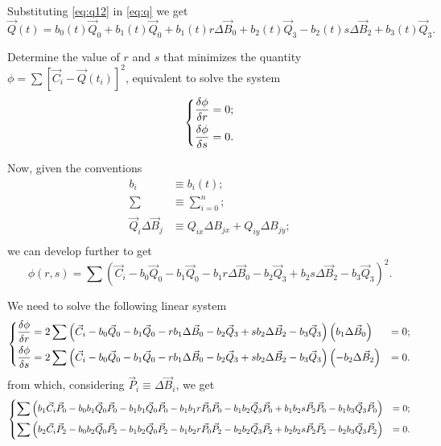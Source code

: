 \documentclass{scrartcl}
\newcommand\V[1]{\vec{#1}}
\begin{document}
Substituting \eqref{eq:q12} in \eqref{eq:q} we get
\begin{equation*}
\V{Q}(t) = b_0(t) \V{Q}_0 + b_1(t) \V{Q}_0 + b_1(t) r \Delta \V{B}_0 +
b_2(t) \V{Q}_3 - b_2(t) s \Delta \V{B}_2 + b_3(t) \V{Q}_3.
\end{equation*}

Determine the value of $r$ and $s$ that minimizes the quantity
$\phi = \sum \left[ \V{C}_i - \V{Q}(t_i) \right]^2$, equivalent to
solve the system
\begin{equation*}
\begin{dcases}
\frac{\delta\phi}{\delta r} = 0;\\
\frac{\delta\phi}{\delta s} = 0.
\end{dcases}
\end{equation*}

Now, given the conventions
\begin{equation*}
\begin{split}
    b_i &\equiv b_i(t); \\
    \sum &\equiv \sum_{i=0}^{n}; \\
    \V{Q}_i \Delta \V{B}_j &\equiv Q_{ix} \Delta B_{jx} + Q_{iy} \Delta B_{jy}; \\
\end{split}
\end{equation*}
we can develop further to get
\begin{equation*}
    \phi(r, s) = \sum \left( \V{C}_i - b_0 \V{Q}_0 - b_1 \V{Q}_0 -
    b_1 r \Delta \V{B}_0 - b_2 \V{Q}_3 + b_2 s \Delta \V{B}_2 - b_3 \V{Q}_3 \right)^2.
\end{equation*}

We need to solve the following linear system
\begin{equation*}
\begin{dcases}
    \frac{\delta \phi}{\delta r} = 2 \sum \left(
	\V{C}_i - b_0 \V{Q}_0 - b_1 \V{Q}_0 - r b_1 \Delta \V{B}_0 -
	b_2 \V{Q}_3 + s b_2 \Delta \V{B}_2 - b_3 \V{Q}_3
    \right) \left( b_1 \Delta \V{B}_0 \right) &= 0; \\
    \frac{\delta \phi}{\delta s} = 2 \sum \left(
	\V{C}_i - b_0 \V{Q}_0 - b_1 \V{Q}_0 - r b_1 \Delta \V{B}_0 -
	b_2 \V{Q}_3 + s b_2 \Delta \V{B}_2 - b_3 \V{Q}_3
    \right) \left( -b_2 \Delta \V{B}_2 \right) &= 0. \\
\end{dcases}
\end{equation*}
from which, considering $\V{P}_i \equiv \Delta \V{B}_i$, we get
\begin{equation*}
\begin{dcases}
    \sum \left(
	b_1 \V{C}_i \V{P}_0 -
	b_0 b_1 \V{Q}_0 \V{P}_0 -
	b_1 b_1 \V{Q}_0 \V{P}_0 -
	b_1 b_1 r \V{P}_0 \V{P}_0 -
	b_1 b_2 \V{Q}_3 \V{P}_0 +
	b_1 b_2 s \V{P}_2 \V{P}_0 -
	b_1 b_3 \V{Q}_3 \V{P}_0
    \right) &= 0; \\
    \sum \left(
	b_2 \V{C}_i \V{P}_2 -
	b_0 b_2 \V{Q}_0 \V{P}_2 -
	b_1 b_2 \V{Q}_0 \V{P}_2 -
	b_1 b_2 r \V{P}_0 \V{P}_2 -
	b_2 b_2 \V{Q}_3 \V{P}_2 +
	b_2 b_2 s \V{P}_2 \V{P}_2 -
	b_2 b_3 \V{Q}_3 \V{P}_2
    \right) &= 0. \\
\end{dcases}
\end{equation*}
\end{document}
